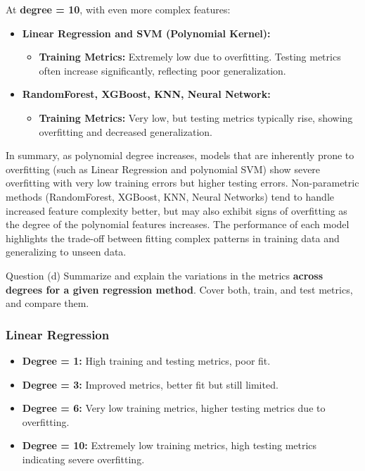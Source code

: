 At \textbf{degree = 10}, with even more complex features:

\begin{itemize}
    \item \textbf{Linear Regression and SVM (Polynomial Kernel):} 
    \begin{itemize}
        \item \textbf{Training Metrics:} Extremely low due to overfitting. Testing metrics often increase significantly, reflecting poor generalization.
    \end{itemize}
    
    \item \textbf{RandomForest, XGBoost, KNN, Neural Network:}
    \begin{itemize}
        \item \textbf{Training Metrics:} Very low, but testing metrics typically rise, showing overfitting and decreased generalization.
    \end{itemize}
\end{itemize}

In summary, as polynomial degree increases, models that are inherently prone to overfitting (such as Linear Regression and polynomial SVM) show severe overfitting with very low training errors but higher testing errors. Non-parametric methods (RandomForest, XGBoost, KNN, Neural Networks) tend to handle increased feature complexity better, but may also exhibit signs of overfitting as the degree of the polynomial features increases. The performance of each model highlights the trade-off between fitting complex patterns in training data and generalizing to unseen data.

\clearpage

\begin{customboxnew}[label={box:Q3d}]{Question (d)}
	Summarize and explain the variations in the metrics \textbf{across degrees for a given regression method}. Cover both, train, and test metrics, and compare them.
\end{customboxnew}

\subsubsection*{Linear Regression}

\begin{itemize}
    \item \textbf{Degree = 1:} High training and testing metrics, poor fit.
    \item \textbf{Degree = 3:} Improved metrics, better fit but still limited.
    \item \textbf{Degree = 6:} Very low training metrics, higher testing metrics due to overfitting.
    \item \textbf{Degree = 10:} Extremely low training metrics, high testing metrics indicating severe overfitting.
\end{itemize}

